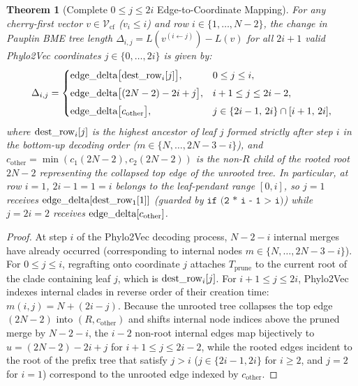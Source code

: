 \documentclass[11pt,a4paper]{article}
\makeatletter
\DeclareRobustCommand{\_}{\ifmmode\nfss@text{\textunderscore}\else\textunderscore\allowbreak\fi}
\newtheorem{theorem}{Theorem}[section]
\theoremstyle{definition}
\makeatother
\begin{document}
\begin{theorem}[Complete $0 \le j \le 2i$ Edge-to-Coordinate Mapping]
\label{thm:full_2i}
For any cherry-first vector $v \in \mathcal{V}_{\text{cf}}$ ($v_i \le i$) and row $i \in \{1, \dots, N-2\}$, the change in Pauplin BME tree length $\Delta_{i, j} = L(v^{(i \leftarrow j)}) - L(v)$ for all $2i+1$ valid Phylo2Vec coordinates $j \in \{0, \dots, 2i\}$ is given by:
\begin{equation}
\Delta_{i, j} = \begin{cases}
\text{edge\_delta}\big[\text{dest\_row}_i[j]\big], & 0 \le j \le i, \\[4pt]
\text{edge\_delta}\big[(2N - 2) - 2i + j\big], & i + 1 \le j \le 2i - 2, \\[4pt]
\text{edge\_delta}\big[c_{\text{other}}\big], & j \in \{2i - 1, \, 2i\} \cap [i + 1, \, 2i],
\end{cases}
\label{eq:full_mapping}
\end{equation}
where $\text{dest\_row}_i[j]$ is the highest ancestor of leaf $j$ formed strictly after step $i$ in the bottom-up decoding order ($m \in \{N, \dots, 2N - 3 - i\}$), and $c_{\text{other}} = \min(c_1(2N-2), c_2(2N-2))$ is the non-$R$ child of the rooted root $2N-2$ representing the collapsed top edge of the unrooted tree. In particular, at row $i = 1$, $2i - 1 = 1 = i$ belongs to the leaf-pendant range $[0, i]$, so $j = 1$ receives $\text{edge\_delta}[\text{dest\_row}_1[1]]$ (guarded by $\texttt{if (2 * i - 1 > i)}$) while $j = 2i = 2$ receives $\text{edge\_delta}[c_{\text{other}}]$.
\end{theorem}
\begin{proof}
At step $i$ of the Phylo2Vec decoding process, $N - 2 - i$ internal merges have already occurred (corresponding to internal nodes $m \in \{N, \dots, 2N - 3 - i\}$). For $0 \le j \le i$, regrafting onto coordinate $j$ attaches $T_{\text{prune}}$ to the current root of the clade containing leaf $j$, which is $\text{dest\_row}_i[j]$. For $i+1 \le j \le 2i$, Phylo2Vec indexes internal clades in reverse order of their creation time: $m(i, j) = N + (2i - j)$. Because the unrooted tree collapses the top edge $(2N-2)$ into $(R, c_{\text{other}})$ and shifts internal node indices above the pruned merge by $N - 2 - i$, the $i - 2$ non-root internal edges map bijectively to $u = (2N-2) - 2i + j$ for $i+1 \le j \le 2i-2$, while the rooted edges incident to the root of the prefix tree that satisfy $j > i$ ($j \in \{2i-1, 2i\}$ for $i \ge 2$, and $j = 2$ for $i = 1$) correspond to the unrooted edge indexed by $c_{\text{other}}$.
\end{proof}
\end{document}
